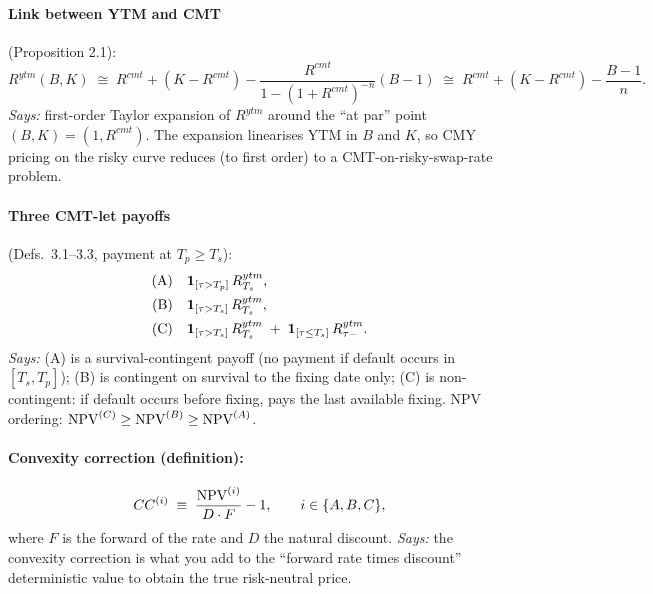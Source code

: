 \documentclass[11pt,a4paper]{article}
\begin{document}
\paragraph{Link between YTM and CMT} (Proposition 2.1):
\begin{equation}\label{eq:ytm-cmt}
  R^{ytm}(B, K) \;\cong\; R^{cmt} + (K - R^{cmt}) - \frac{R^{cmt}}{1 - (1+R^{cmt})^{-n}} (B - 1)
                \;\cong\; R^{cmt} + (K - R^{cmt}) - \frac{B - 1}{n}.
\end{equation}
\textit{Says:} first-order Taylor expansion of $R^{ytm}$ around the
``at par'' point $(B, K) = (1, R^{cmt})$. The expansion linearises YTM
in $B$ and $K$, so CMY pricing on the risky curve reduces (to first
order) to a CMT-on-risky-swap-rate problem.

\paragraph{Three CMT-let payoffs} (Defs.\ 3.1--3.3, payment at $T_p \ge T_s$):
\begin{align}
  \text{(A)} \quad & \mathbf{1}_{[\tau > T_p]}\, R^{ytm}_{T_s}, \label{eq:payoff-A}\\
  \text{(B)} \quad & \mathbf{1}_{[\tau > T_s]}\, R^{ytm}_{T_s}, \label{eq:payoff-B}\\
  \text{(C)} \quad & \mathbf{1}_{[\tau > T_s]}\, R^{ytm}_{T_s} \;+\; \mathbf{1}_{[\tau \le T_s]}\, R^{ytm}_{\tau-}. \label{eq:payoff-C}
\end{align}
\textit{Says:} (A) is a survival-contingent payoff (no payment if
default occurs in $[T_s, T_p]$); (B) is contingent on survival to the
fixing date only; (C) is non-contingent: if default occurs before
fixing, pays the last available fixing. NPV ordering:
$\mathrm{NPV}^{(C)} \ge \mathrm{NPV}^{(B)} \ge \mathrm{NPV}^{(A)}$.

\paragraph{Convexity correction (definition):}
\begin{equation}\label{eq:cc-def}
  CC^{(i)} \;\equiv\; \frac{\mathrm{NPV}^{(i)}}{D \cdot F} - 1, \qquad i \in \{A, B, C\},
\end{equation}
where $F$ is the forward of the rate and $D$ the natural discount.
\textit{Says:} the convexity correction is what you add to the
``forward rate times discount'' deterministic value to obtain the
true risk-neutral price.
\end{document}
